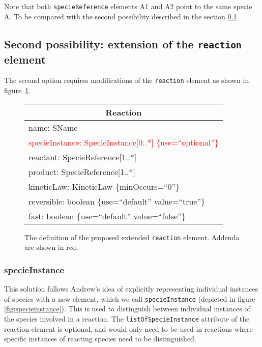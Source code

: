 \documentclass{cekarticle}
\begin{document}
Note that both \texttt{specieReference} elements A1 and A2 point to the same
specie A. To be compared with the second possibility described in the section
\ref{sec:reactsecond}

\subsection{Second possibility: extension of the \texttt{reaction} element}\label{sec:reactsecond}

The second option requires modifications of the \texttt{reaction} element as
shown in figure~\ref{fig:reaction2}.

\begin{figure}[h]
  \vspace*{8pt}
  \centering
  \begin{tabular}{|l|}
    \hline
    \multicolumn{1}{|c|}{\rule[-3mm]{0mm}{8mm}{\textsf{Reaction}}}\\
    \hline
    \rule[0mm]{0mm}{5mm}{\textsf{\small name: SName }}\\
    \textsf{\small \textcolor{red}{specieInstance: SpecieInstance[0..*] \{use=``optional''\} }}\\
    \textsf{\small reactant: SpecieReference[1..*]  }\\
    \textsf{\small product: SpecieReference[1..*]  }\\
    \textsf{\small kineticLaw: KineticLaw \{minOccurs=``0''\}  }\\
    \textsf{\small reversible: boolean \{use=``default'' value=``true''\} }\\
    \rule[-3mm]{0mm}{5mm}{\textsf{\small fast: boolean \{use=``default'' value=``false''\} }}\\
    \hline
  \end{tabular}
  \caption{The definition of the proposed extended \texttt{reaction} element. Addenda are shown in red.}
  \label{fig:reaction2}
\end{figure}

\subsubsection{specieInstance}

This solution follows Andrew's idea of explicitly representing
individual instances of species with a new element, which we call
\texttt{specieInstance} (depicted in figure \ref{fig:specieinstance}).  This is used to distinguish between individual
instances of the species involved in a reaction.  The
\texttt{listOfSpecieInstance} attribute of the reaction element is optional,
and would only need to be used in reactions where specific instances
of reacting species need to be distinguished. 
\end{document}
